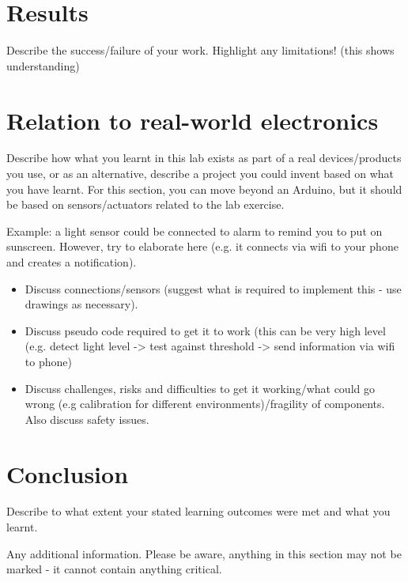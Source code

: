 \documentclass[journal]{IEEEtran}
\begin{document}
\section{Results}
Describe the success/failure of your work.
Highlight any limitations! (this shows understanding)

\section{Relation to real-world electronics}

Describe how what you learnt in this lab exists as part of a real devices/products you use, or as an alternative, describe a project you could invent based on what you have learnt.
For this section, you can move beyond an Arduino, but it should be based on  sensors/actuators related to the lab exercise.

Example: a light sensor could be connected to alarm to remind you to put on sunscreen. However, try to elaborate here (e.g. it connects via wifi to your phone and creates a notification). 

\begin{itemize}
  \item Discuss connections/sensors (suggest what is required to implement this - use drawings as necessary).
  \item Discuss pseudo code required to get it to work (this can be very high level (e.g. detect light level -> test against threshold -> send information via wifi to phone) 
  \item Discuss challenges, risks and difficulties to get it working/what could go wrong (e.g calibration for different environments)/fragility of components. Also discuss safety issues.
\end{itemize}

\section{Conclusion}
Describe to what extent your stated learning outcomes were met and what you learnt.




\appendix

Any additional information. Please be aware, anything in this section may not be marked - it cannot contain anything critical. 
\end{document}

